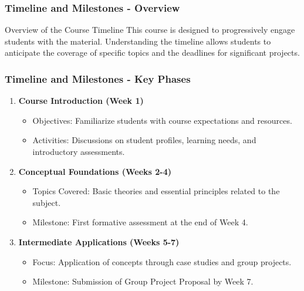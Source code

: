 \documentclass[aspectratio=169]{beamer}
\begin{document}
\begin{frame}[fragile]
    \frametitle{Timeline and Milestones - Overview}
    \begin{block}{Overview of the Course Timeline}
        This course is designed to progressively engage students with the material. 
        Understanding the timeline allows students to anticipate the coverage of specific topics and the deadlines for significant projects.
    \end{block}
\end{frame}

\begin{frame}[fragile]
    \frametitle{Timeline and Milestones - Key Phases}
    \begin{enumerate}
        \item \textbf{Course Introduction (Week 1)}
            \begin{itemize}
                \item Objectives: Familiarize students with course expectations and resources.
                \item Activities: Discussions on student profiles, learning needs, and introductory assessments.
            \end{itemize}

        \item \textbf{Conceptual Foundations (Weeks 2-4)}
            \begin{itemize}
                \item Topics Covered: Basic theories and essential principles related to the subject.
                \item Milestone: First formative assessment at the end of Week 4.
            \end{itemize}

        \item \textbf{Intermediate Applications (Weeks 5-7)}
            \begin{itemize}
                \item Focus: Application of concepts through case studies and group projects.
                \item Milestone: Submission of Group Project Proposal by Week 7.
            \end{itemize}
    \end{enumerate}
\end{frame}
\end{document}
